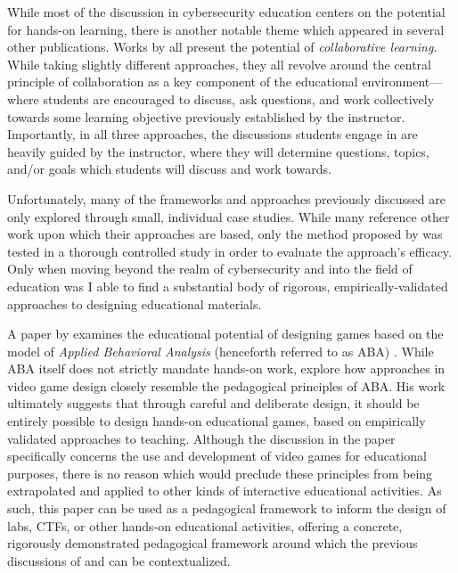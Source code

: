 
    While most of the discussion in cybersecurity education centers on the potential for hands-on learning, there is another notable theme which appeared in several other publications. %
Works by \textcite{P-Deshpande, C-Kussmaul,B-Payne} all present the potential of \emph{collaborative learning}. %
While taking slightly different approaches, they all revolve around the central principle of collaboration as a key component of the educational environment---%
where students are encouraged to discuss, ask questions, and work collectively towards some learning objective previously established by the instructor. %
Importantly, in all three approaches, the discussions students engage in are heavily guided by the instructor, where they will determine questions, topics, and/or goals which students will discuss and work towards. 



    Unfortunately, many of the frameworks and approaches previously discussed are only explored through small, individual case studies. %
While many reference other work upon which their approaches are based, only the method proposed by \citeauthor{P-Deshpande} was tested in a thorough controlled study in order to evaluate the approach's efficacy. %
Only when moving beyond the realm of cybersecurity and into the field of education was I able to find a substantial body of rigorous, empirically-validated approaches to designing educational materials. 

    A paper by \citeauthor{C-Linehan} examines the educational potential of designing games based on the model of \emph{Applied Behavioral Analysis} (henceforth referred to as ABA) \cite{C-Linehan}. %
While ABA itself does not strictly mandate hands-on work, \citeauthor{C-Linehan} explore how approaches in video game design closely resemble the pedagogical principles of ABA. His work ultimately suggests that through careful and deliberate design, it should be entirely possible to design hands-on educational games, based on empirically validated approaches to teaching. %
Although the discussion in the paper specifically concerns the use and development of video games for educational purposes, there is no reason which would preclude these principles from being extrapolated and applied to other kinds of interactive educational activities. %
As such, this paper can be used as a pedagogical framework to inform the design of labs, CTFs, or other hands-on educational activities, offering a concrete, rigorously demonstrated pedagogical framework around which the previous discussions of \citeauthor{J-Sweller} and \citeauthor{R-Weiss} can be contextualized. 

